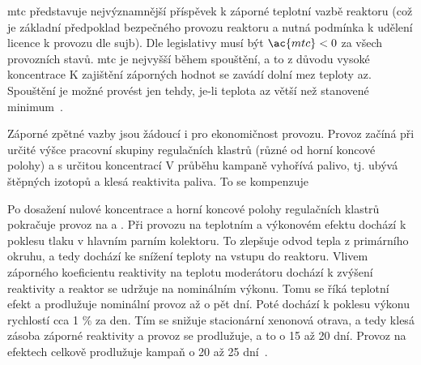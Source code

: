 \ac{mtc} představuje nejvýznamnější příspěvek k záporné teplotní vazbě reaktoru (což je základní předpoklad bezpečného 
provozu reaktoru a nutná podmínka k udělení licence k provozu dle \ac{sujb}). Dle legislativy 
musí být $\ac{mtc}<0$ za všech provozních stavů. \ac{mtc} je nejvyšší během spouštění, a to z důvodu vysoké koncentrace  
K zajištění záporných hodnot se zavádí dolní mez teploty \ac{az}. Spouštění je možné provést jen tehdy, je-li teplota \ac{az} větší než stanovené 
minimum~\cite{sklenka, hezoucky}. 

Záporné zpětné vazby jsou žádoucí i pro ekonomičnost provozu. Provoz začíná při určité výšce pracovní skupiny regulačních klastrů (různé od horní 
koncové polohy) a s určitou koncentrací  V průběhu kampaně vyhořívá palivo, tj. ubývá štěpných izotopů a klesá reaktivita 
paliva. To se kompenzuje

Po dosažení nulové koncentrace  a horní koncové polohy regulačních klastrů pokračuje provoz na  a . 
Při provozu na teplotním a výkonovém efektu dochází k poklesu tlaku v hlavním parním kolektoru. To zlepšuje odvod tepla z primárního okruhu, a tedy 
dochází ke snížení teploty na vstupu do reaktoru. Vlivem záporného koeficientu reaktivity na teplotu moderátoru dochází k zvýšení reaktivity a 
reaktor se udržuje na nominálním výkonu. Tomu se říká teplotní efekt a prodlužuje nominální provoz až o pět dní. Poté dochází k poklesu výkonu 
rychlostí cca 1 \% za den. Tím se snižuje stacionární xenonová otrava, a tedy klesá zásoba záporné reaktivity a provoz se prodlužuje, 
a to o 15 až 20 dní. 
Provoz na efektech celkově prodlužuje kampaň o 20 až 25 dní~\cite{sklenka}.

